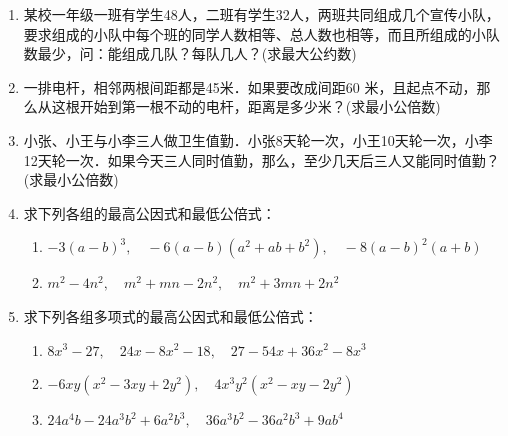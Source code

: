 \begin{enumerate}
\item 某校一年级一班有学生48人，二班有学生32人，两班共同组成几个宣传小队，要求组成的小队中每个班的同学人数相等、总人数也相等，而且所组成的小队数最少，问：能组成几队？每队几人？(求最大公约数)
\item 一排电杆，相邻两根间距都是45米．如果要改成间距60
米，且起点不动，那么从这根开始到第一根不动的电杆，距离是多少米？(求最小公倍数)
\item 小张、小王与小李三人做卫生值勤．小张8天轮一次，小王10天轮一次，小李12天轮一次．如果今天三人同时值勤，那么，至少几天后三人又能同时值勤？(求最小公倍数)
\item 求下列各组的最高公因式和最低公倍式：
\begin{enumerate}
    \item $-3(a-b)^{3},\quad -6(a-b)\left(a^{2}+a b+b^{2}\right),\quad -8(a-b)^{2}(a+b)$
    \item $m^{2}-4 n^{2},\quad  m^{2}+m n-2 n^{2},\quad m^{2}+3 m n+2 n^{2}$
\end{enumerate}

\item 求下列各组多项式的最高公因式和最低公倍式：
\begin{enumerate}
    \item  $8 x^{3}-27,\quad 24 x-8 x^{2}-18,\quad 27-54 x+36 x^{2}-8 x^{3}$ 
    \item  $-6 x y\left(x^{2}-3 x y+2 y^{2}\right),\quad  4 x^{3} y^{2}\left(x^{2}-x y-2 y^{2}\right)$
    \item  $24 a^{4} b-24 a^{3} b^{2}+6 a^{2} b^{3}, \quad  36 a^{3} b^{2}-36 a^{2} b^{3}+9 a b^{4}$
\end{enumerate}


\end{enumerate}
